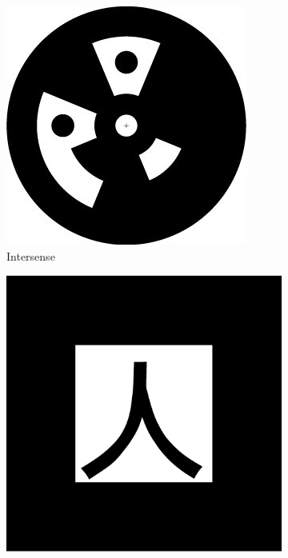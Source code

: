 \documentclass[runningheads]{llncs}
\begin{document}
\begin{figure}
 \begin{subfigure}[b]{0.19\textwidth}
  \centering
  \includegraphics[width=\linewidth]{intersense.jpg}
  Intersense\cite{NaimarkF02}
 \end{subfigure}
 \begin{subfigure}[b]{0.14\textwidth}
 \centering
  \includegraphics[width=\linewidth]{pattKanji.pdf}

\end{subfigure}
\end{figure}
\end{document}
